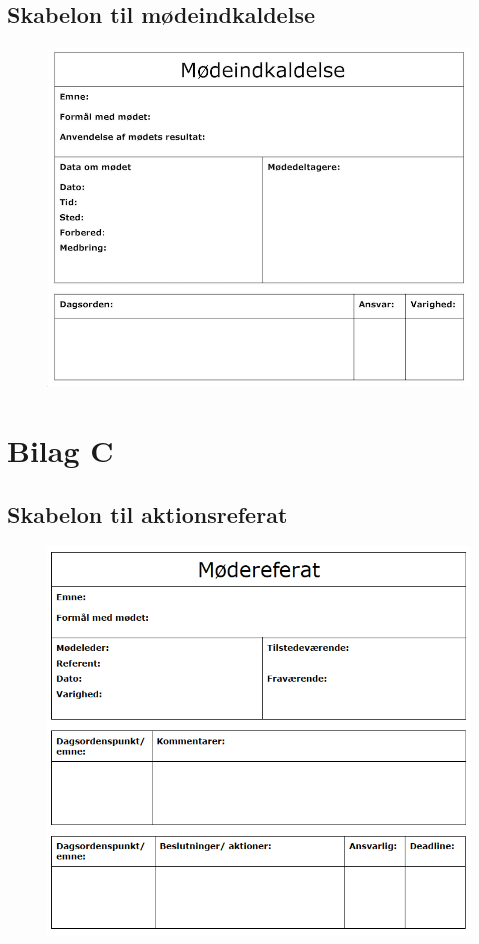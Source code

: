 \subsection{Skabelon til mødeindkaldelse}
\label{App:skabelon}
\begin{figure}[htb]
\centering
\includegraphics[width=6in]{mode}	
\end{figure}

\newpage

\section{Bilag C}
\subsection{Skabelon til aktionsreferat}
\label{App:skabelonak}
\begin{figure}[htb]
\centering
\includegraphics[width=6in]{Aktionsreferat.png}	
\end{figure}

